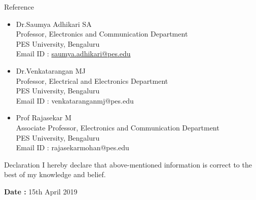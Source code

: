 \documentclass{resume} %
\begin{document}
\begin{rSection}{Reference}
\begin{itemize}
	\item Dr.Saumya Adhikari SA\\
		Professor, Electronics and Communication Department\\
		PES University, Bengaluru\\
		Email ID : \href {https://faculty.pes.edu/p10110}{saumya.adhikari@pes.edu} \\

	\item Dr.Venkatarangan MJ\\
		Professor, Electrical and Electronics Department\\
		PES University, Bengaluru\\
		Email ID : venkataranganmj@pes.edu \\

	\item Prof Rajasekar M\\
		Associate Professor, Electronics and Communication Department\\
		PES University, Bengaluru\\
		Email ID :  rajasekarmohan@pes.edu \\
\end{itemize}
\end{rSection}

\begin{rSection}{Declaration}
I hereby declare that above-mentioned information is correct to the best of my knowledge and belief. \\
\end{rSection}

{\bf Date : } 15th April 2019
\end{document}
